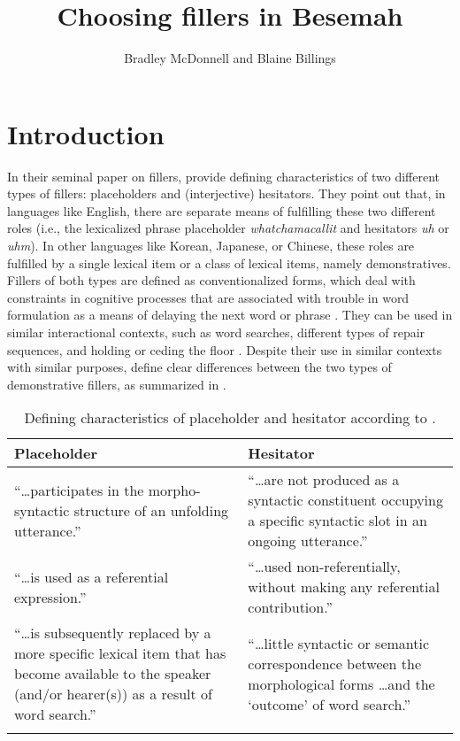 \documentclass[output=paper,
\ChapterDOI{10.5281/zenodo.15697583}
colorlinks,
citecolor=brown]{langscibook}
\author{Bradley McDonnell\orcid{}\affiliation{University of Hawai‘i at Mānoa} and
Blaine Billings\orcid{}\affiliation{University of Hawai‘i at Mānoa}}
\title{Choosing fillers in Besemah}
\begin{document}
\maketitle

\section{Introduction}\label{sec:intro}
In their seminal paper on fillers, \citet{hayashi2006crosslinguistic} provide defining characteristics of two different types of fillers: placeholders and (interjective) hesitators. They point out that, in languages like English, there are separate means of fulfilling these two different roles (i.e., the lexicalized phrase placeholder \textit{whatchamacallit} and hesitators \textit{uh} or \textit{uhm}). In other languages like Korean, Japanese, or Chinese, these roles are fulfilled by a single lexical item or a class of lexical items, namely demonstratives. Fillers of both types are defined as conventionalized forms, which deal with constraints in cognitive processes that are associated with trouble in word formulation as a means of delaying the next word or phrase \citep[see][]{hayashi2003joint,hayashi2006crosslinguistic,fox2010introduction}. They can be used in similar interactional contexts, such as word searches, different types of repair sequences, and holding or ceding the floor \citep{clark2002using}. Despite their use in similar contexts with similar purposes, \citet{hayashi2006crosslinguistic} define clear differences between the two types of demonstrative fillers, as summarized in .

\begin{table}
\caption{Defining characteristics of placeholder and hesitator according to \citet{hayashi2006crosslinguistic}.}
\label{tab:filler}
\begin{tabularx}{1\textwidth}{X X}
\lsptoprule
Placeholder  & Hesitator\\
\midrule
``\ldots participates in the morpho-syntactic structure of an unfolding utterance.''
& ``\ldots are not produced as a syntactic constituent occupying a specific syntactic slot in an ongoing utterance.''\\[3em]

``\ldots is used as a referential expression.''
& ``\ldots used non-referentially, without making any referential contribution.''\\[2em]

``\ldots is subsequently replaced by a more specific lexical item that has become available to the speaker (and/or hearer(s)) as a result of word search.''
& ``\ldots little syntactic or semantic correspondence between the morphological forms \ldots and the `outcome' of word search.''\\
\lspbottomrule
\end{tabularx}
\end{table}
\end{document}
